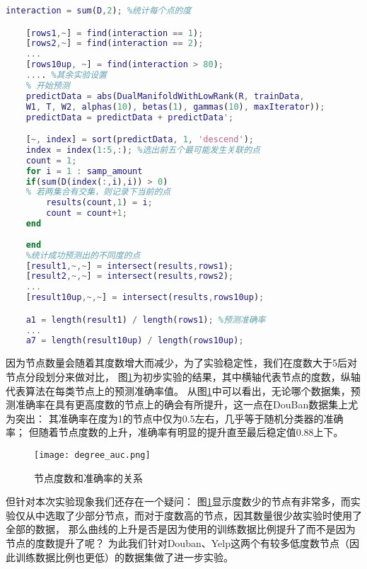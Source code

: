 \begin{lstlisting}[caption={节点度数与算法性能的关系实验代码},language=Matlab]
    interaction = sum(D,2); %统计每个点的度

    [rows1,~] = find(interaction == 1);
    [rows2,~] = find(interaction == 2);
    ...
    [rows10up, ~] = find(interaction > 80);
    .... %其余实验设置
    % 开始预测
    predictData = abs(DualManifoldWithLowRank(R, trainData, 
    W1, T, W2, alphas(10), betas(1), gammas(10), maxIterator)); 
    predictData = predictData + predictData';

    [~, index] = sort(predictData, 1, 'descend');
    index = index(1:5,:); %选出前五个最可能发生关联的点
    count = 1;
    for i = 1 : samp_amount
    if(sum(D(index(:,i),i)) > 0) 
    % 若两集合有交集，则记录下当前的点
        results(count,1) = i;
        count = count+1;
    end
        
    end
    %统计成功预测出的不同度的点
    [result1,~,~] = intersect(results,rows1); 
    [result2,~,~] = intersect(results,rows2);
    ...
    [result10up,~,~] = intersect(results,rows10up);

    a1 = length(result1) / length(rows1); %预测准确率
    ...
    a7 = length(result10up) / length(rows10up);

\end{lstlisting}


因为节点数量会随着其度数增大而减少，为了实验稳定性，我们在度数大于5后对节点分段划分来做对比，
图\ref{experiments:fig:degree_auc}为初步实验的结果，其中横轴代表节点的度数，纵轴代表算法在每类节点上的预测准确率值。
从图\ref{experiments:fig:degree_auc}中可以看出，无论哪个数据集，预测准确率在具有更高度数的节点上的确会有所提升，这一点在DouBan数据集上尤为突出：
其准确率在度为1的节点中仅为0.5左右，几乎等于随机分类器的准确率；
但随着节点度数的上升，准确率有明显的提升直至最后稳定值0.88上下。


\begin{figure}
    \centering
    \texttt{[image: degree\_auc.png]}
    \caption{节点度数和准确率的关系}
    \label{experiments:fig:degree_auc}
\end{figure}

但针对本次实验现象我们还存在一个疑问：
图\ref{experiments:fig:degree_auc}显示度数少的节点有非常多，而实验仅从中选取了少部分节点，而对于度数高的节点，因其数量很少故实验时使用了全部的数据，
那么曲线的上升是否是因为使用的训练数据比例提升了而不是因为节点的度数提升了呢？
为此我们针对Douban、Yelp这两个有较多低度数节点（因此训练数据比例也更低）的数据集做了进一步实验。


